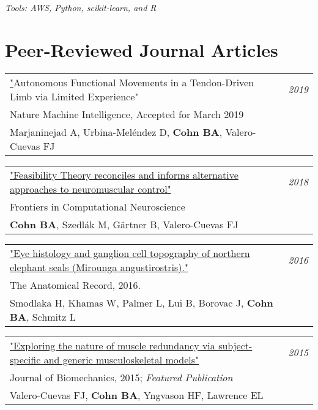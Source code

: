\documentclass[10pt,a4paper]{article}
\begin{document}
  \vspace*{2mm}\setlength\parindent{2mm}\begin{minipage}{16.8cm}
    \textit{Tools: AWS, Python, scikit-learn, and R} 
  \end{minipage}




  \vspace*{3mm}\section*{Peer-Reviewed Journal Articles} 


\vspace*{1mm}\noindent\begin{tabularx}{17cm}{X r}
   \href{}
   "Autonomous Functional Movements in a Tendon-Driven Limb via Limited Experience" & \textit{2019}\\
    Nature Machine Intelligence, Accepted for March 2019 \\
   Marjaninejad A, Urbina-Mel\'{e}ndez D, \textbf{Cohn BA}, Valero-Cuevas FJ \\[2mm]
\end{tabularx}


\vspace*{1mm}\noindent\begin{tabularx}{17cm}{X r}
   \href{https://github.com/bc/resume/raw/master/papers/cohn_et_al_2018_frontiers.pdf}{"Feasibility Theory reconciles and informs alternative approaches to neuromuscular control"} & \textit{2018}\\
   Frontiers in Computational Neuroscience \\
	 \textbf{Cohn BA}, Szedl\'{a}k M, G{\"a}rtner B, Valero-Cuevas FJ \\[2mm]
\end{tabularx}


\vspace*{1mm}\noindent\begin{tabularx}{17cm}{X r}
    \href{smodlaka_et_al_2016_the_anatomical_record.pdf}{"Eye histology and ganglion cell topography of northern elephant seals (Mirounga angustirostris)."}  & \textit{2016}\\
    The Anatomical Record, 2016. \\
    Smodlaka H, Khamas W, Palmer L, Lui B, Borovac J, \textbf{Cohn BA}, Schmitz L \\[2mm]
\end{tabularx}

\vspace*{1mm}\noindent\begin{tabularx}{17cm}{X r}
    \href{https://github.com/bc/resume/raw/master/papers/valero_cuevas_2015_job.pdf}{"Exploring the nature of muscle redundancy via subject-specific and generic musculoskeletal models" } & \textit{2015}\\
    Journal of Biomechanics, 2015; \textit{Featured Publication} \\
    Valero-Cuevas FJ, \textbf{Cohn BA}, Yngvason HF, Lawrence EL \\[2mm]
\end{tabularx}
\end{document}
